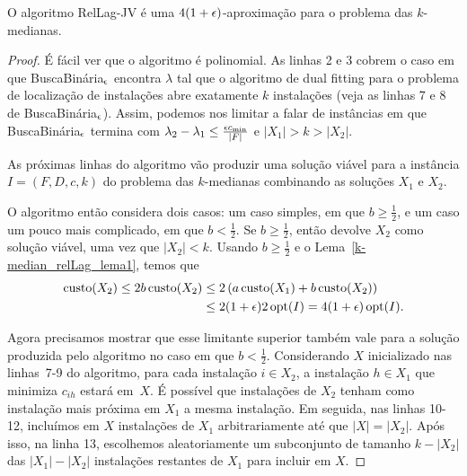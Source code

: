 \begin{lemma}
    O algoritmo {\sc RelLag-JV} é uma $4(1 + \epsilon)$-aproximação para o problema das $k$-medianas.
\end{lemma}
\begin{proof}

É fácil ver que o algoritmo é polinomial. As linhas 2 e 3 cobrem o caso em que {\sc BuscaBinária$_\epsilon$} encontra $\lambda$ tal que o algoritmo de dual fitting para o problema de localização de instalações abre exatamente $k$ instalações (veja as linhas 7 e 8 de {\sc BuscaBinária$_\epsilon$}). Assim, podemos nos limitar a falar de instâncias em que {\sc BuscaBinária$_\epsilon$} termina com $\lambda_2 - \lambda_1 \leq \frac{\epsilon c_\text{min}}{|F|}$ e $|X_1| > k > |X_2|$.

As próximas linhas do algoritmo vão produzir uma solução viável para a instância $I = (F,D,c,k)$ do problema das $k$-medianas combinando as soluções $X_1$ e $X_2$.

O algoritmo então considera dois casos: um caso simples, em que $b \geq \frac{1}{2}$, e um caso um pouco mais complicado, em que $b < \frac{1}{2}$. Se $b \geq \frac{1}{2}$, então devolve $X_2$ como solução viável, uma vez que $|X_2| < k$. Usando $b \geq \frac{1}{2}$ e o Lema~\ref{k-median_relLag_lema1}, temos que
\begin{subequations}
    \begin{align*}
        \mathrm{custo}(X_2) \leq 2b\,\mathrm{custo}(X_2) &\leq 2\left(a\,\mathrm{custo}(X_1) + b\,\mathrm{custo}(X_2) \right) \\
        &\leq 2(1+\epsilon) 2\, \mathrm{opt}(I) = 4(1+\epsilon)\, \mathrm{opt}(I).
    \end{align*}
\end{subequations}

Agora precisamos mostrar que esse limitante superior também vale para a solução produzida pelo algoritmo no caso em que $ b < \frac{1}{2}$. Considerando $X$ inicializado nas linhas~7-9 do algoritmo, para cada instalação $i \in X_2$, a instalação $h \in X_1$ que minimiza $c_{ih}$ estará em~$X$. É possível que instalações de $X_2$ tenham como instalação mais próxima em $X_1$ a mesma instalação. Em seguida, nas linhas 10-12, incluímos em $X$ instalações de $X_1$ arbitrariamente até que $|X| = |X_2|$. Após isso, na linha 13, escolhemos aleatoriamente um subconjunto de tamanho $k - |X_2|$ das $|X_1| - |X_2|$ instalações restantes de $X_1$ para incluir em $X$. 


\end{proof}
